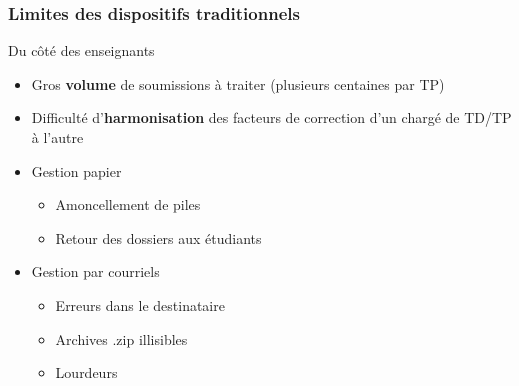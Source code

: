 \documentclass[svgnames,hyperref, french, xcolor=dvipsnames,usenames]{beamer}		        %
\begin{document}
\frame
{
        \frametitle{Limites des dispositifs traditionnels}

        \begin{alertblock}{Du côté des enseignants}
                \begin{itemize}
                        \item Gros \textbf{volume} de soumissions à traiter (plusieurs centaines par TP)
                        \item Difficulté d'\textbf{harmonisation} des facteurs de correction d'un chargé de TD/TP à l'autre
                        \item Gestion papier
                                \begin{itemize}
                                        \item Amoncellement de piles
                                        \item Retour des dossiers aux étudiants
                                \end{itemize}
                        \item Gestion par courriels
                                \begin{itemize}
                                        \item Erreurs dans le destinataire
                                        \item Archives .zip illisibles
                                        \item Lourdeurs
                                \end{itemize}
                \end{itemize}
        \end{alertblock}
}
\end{document}
